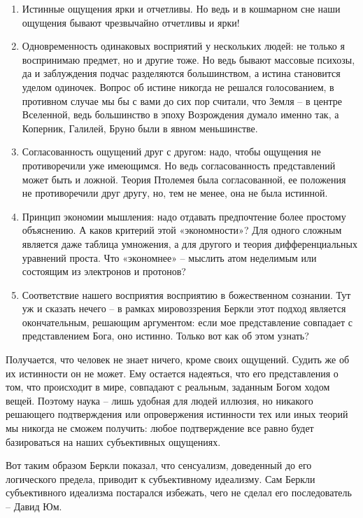 \documentclass[a4paper, 14pt]{extreport}
\begin{document}
\begin{enumerate}
\def\labelenumi{\arabic{enumi}.}

\item
  Истинные ощущения ярки и отчетливы. Но ведь и в кошмарном сне наши
  ощущения бывают чрезвычайно отчетливы и ярки!
\item
  Одновременность одинаковых восприятий у нескольких людей: не только я
  воспринимаю предмет, но и другие тоже. Но ведь бывают массовые
  психозы, да и заблуждения подчас разделяются большинством, а истина
  становится уделом одиночек. Вопрос об истине никогда не решался
  голосованием, в противном случае мы бы с вами до сих пор считали, что
  Земля -- в центре Вселенной, ведь большинство в эпоху Возрождения
  думало именно так, а Коперник, Галилей, Бруно были в явном
  меньшинстве.
\item
  Согласованность ощущений друг с другом: надо, чтобы ощущения не
  противоречили уже имеющимся. Но ведь согласованность представлений
  может быть и ложной. Теория Птолемея была согласованной, ее положения
  не противоречили друг другу, но, тем не менее, она не была истинной.
\item
  Принцип экономии мышления: надо отдавать предпочтение более простому
  объяснению. А каков критерий этой «экономности»? Для одного сложным
  является даже таблица умножения, а для другого и теория
  дифференциальных уравнений проста. Что «экономнее» -- мыслить атом
  неделимым или состоящим из электронов и протонов?
\item
  Соответствие нашего восприятия восприятию в божественном сознании. Тут
  уж и сказать нечего -- в рамках мировоззрения Беркли этот подход
  является окончательным, решающим аргументом: если мое представление
  совпадает с представлением Бога, оно истинно. Только вот как об этом
  узнать?
\end{enumerate}

Получается, что человек не знает ничего, кроме своих ощущений. Судить же
об их истинности он не может. Ему остается надеяться, что его
представления о том, что происходит в мире, совпадают с реальным,
заданным Богом ходом вещей. Поэтому наука -- лишь удобная для людей
иллюзия, но никакого решающего подтверждения или опровержения истинности
тех или иных теорий мы никогда не сможем получить: любое подтверждение
все равно будет базироваться на наших субъективных ощущениях.

Вот таким образом Беркли показал, что сенсуализм, доведенный до его
логического предела, приводит к субъективному идеализму. Сам Беркли
субъективного идеализма постарался избежать, чего не сделал его
последователь -- Давид Юм.
\end{document}
